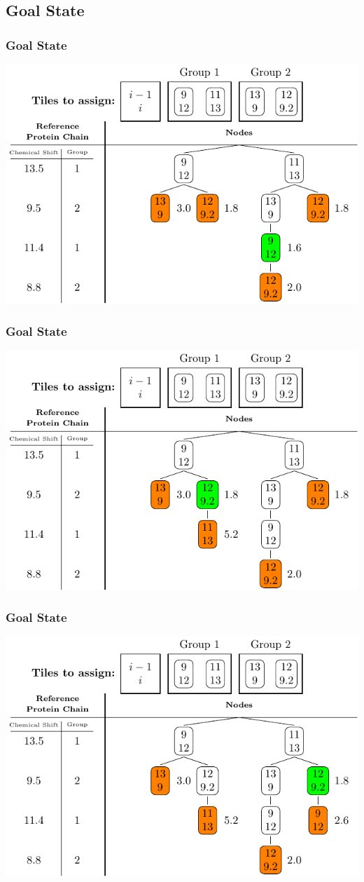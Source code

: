 \documentclass{beamer}
\begin{document}
\subsection{Goal State}
\begin{frame}
	\frametitle{Goal State}
	\vspace{-.5cm} 
	\center
	\includegraphics[width=.9\textwidth]{tilePlacement/step7}
\end{frame}

\begin{frame}
	\frametitle{Goal State}
	\vspace{-.5cm} 
	\center
	\includegraphics[width=.9\textwidth]{tilePlacement/step8}
\end{frame}

\begin{frame}
	\frametitle{Goal State}
	\vspace{-.5cm} 
	\center
	\includegraphics[width=.9\textwidth]{tilePlacement/step9}
\end{frame}
\end{document}
